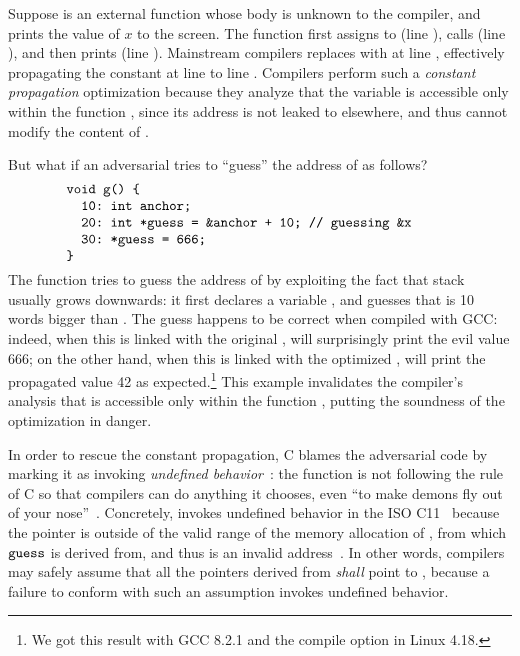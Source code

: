 \noindent Suppose  is an external function whose body is unknown to the compiler, and
 prints the value of $x$ to the screen.  The function  first assigns
 to  (line ), calls  (line ), and then prints 
(line ).  Mainstream compilers replaces  with  at line ,
effectively propagating the constant  at line  to line .  Compilers
perform such a \emph{constant propagation} optimization because they analyze that the variable
 is accessible only within the function , since its address is not leaked to
elsewhere, and thus  cannot modify the content of .

But what if an adversarial  tries to ``guess'' the address of  as follows?
%
\[
\begin{minipage}{0.8\textwidth}
\begin{verbatim}
void g() {
  10: int anchor;
  20: int *guess = &anchor + 10; // guessing &x
  30: *guess = 666;
}
\end{verbatim}
\end{minipage}
\]
%
\noindent The function  tries to guess the address of  by exploiting the fact that
stack usually grows downwards: it first declares a variable , and guesses that
 is 10 words bigger than .  The guess happens to be correct when compiled
with GCC: indeed, when this  is linked with the original ,  will
surprisingly print the evil value 666; on the other hand, when this  is linked with the
optimized ,  will print the propagated value 42 as expected.\footnote{We got
  this result with GCC 8.2.1 and the compile option  in Linux 4.18.} This
example invalidates the compiler's analysis that  is accessible only within the function
, putting the soundness of the optimization in danger.

In order to rescue the constant propagation, C blames the adversarial code by marking it as invoking
\emph{undefined behavior}~\cite{undefined-behavior}: the function  is not following the
rule of C so that compilers can do anything it chooses, even ``to make demons fly out of your
nose''~\cite{nasal-demons}.  Concretely,  invokes undefined behavior in the ISO
C11~\cite{c11} because the pointer  is outside of the valid range of the memory
allocation of , from which $\texttt{guess}$ is derived from, and thus  is an
invalid address~\cite{c11-6.5.6p8}.  In other words, compilers may safely assume that all the
pointers derived from  \emph{shall} point to , because a failure to
conform with such an assumption invokes undefined behavior.

